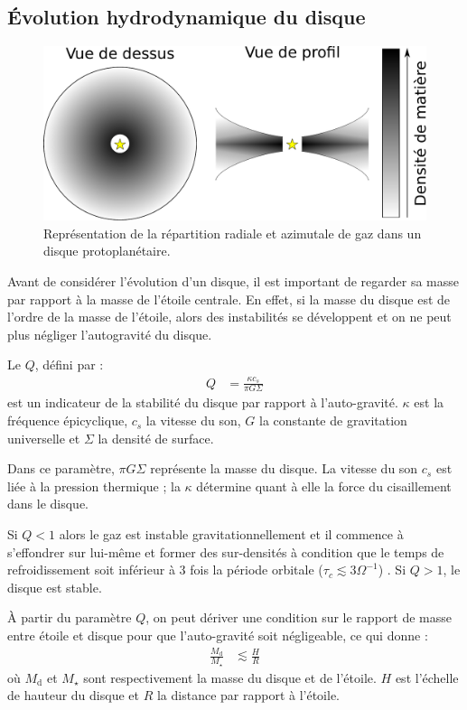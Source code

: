 \subsection{Évolution hydrodynamique du disque}
\begin{figure}[htbp]
\centering
\includegraphics[width=0.6\linewidth]{figure/disk_scheme.pdf}
\caption[Vue de face et de profil d'un disque de gaz.]{Représentation de la répartition radiale et azimutale
de gaz dans un disque protoplanétaire.}\label{fig:disk_scheme}
\end{figure}

Avant de considérer l'évolution d'un disque, il est important de regarder sa masse par rapport à la masse de l'étoile centrale. En effet, si la masse du disque est de l'ordre de la masse de l'étoile, alors des instabilités se développent et on ne peut plus négliger l'autogravité du disque. 

Le  $Q$, défini par \citep{toomre1964gravitational, goldreich1965gravitational}:
\begin{align}
Q &= \frac{\kappa c_{s}}{\pi G \Sigma}
\end{align}
est un indicateur de la stabilité du disque par rapport à l'auto-gravité. $\kappa$ est la fréquence épicyclique, $c_s$ la vitesse du son, $G$ la constante de gravitation universelle et $\Sigma$ la densité de surface. 

Dans ce paramètre, $\pi G \Sigma$ représente la masse du disque. La vitesse du son $c_{s}$ est liée à la pression thermique ; la  $\kappa$ détermine quant à elle la force du cisaillement dans le disque.

\bigskip

Si $Q<1$ alors le gaz est instable gravitationnellement et il commence à s'effondrer sur lui-même et former des sur-densités à condition que le temps de refroidissement soit inférieur à 3 fois la période orbitale ($\tau_c \lesssim 3 \Omega^{-1}$) \citep{gammie2001nonlinear}.
Si $Q>1$, le disque est stable.

À partir du paramètre $Q$, on peut dériver une condition sur le rapport de masse entre étoile et disque pour que l'auto-gravité soit négligeable, ce qui donne \citep{gammie2001nonlinear} : 
\begin{align}
\frac{M_\text{d}}{M_\star} &\lesssim \frac{H}{R}
\end{align}
où $M_\text{d}$ et $M_\star$ sont respectivement la masse du disque et de l'étoile. $H$ est l'échelle de hauteur du disque et $R$ la distance par rapport à l'étoile.

